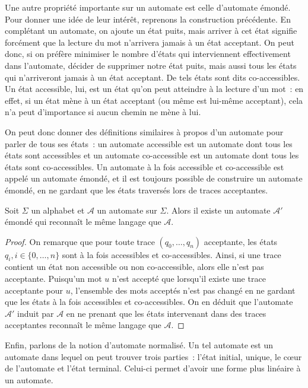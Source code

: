 Une autre propriété importante sur un automate est celle d'automate émondé.
Pour donner une idée de leur intérêt, reprenons la construction précédente.
En complétant un automate, on ajoute un état puits, mais arriver à cet état
signifie forcément que la lecture du mot n'arrivera jamais à un état acceptant.
On peut donc, si on préfère minimiser le nombre d'états qui interviennent
effectivement dans l'automate, décider de supprimer notre état puits, mais aussi
tous les états qui n'arriveront jamais à un état acceptant. De tels états sont
dits co-accessibles. Un état accessible, lui, est un état qu'on peut atteindre
à la lecture d'un mot~: en effet, si un état mène à un état acceptant (ou même
est lui-même acceptant), cela n'a peut d'importance si aucun chemin ne mène à
lui.

On peut donc donner des définitions similaires à propos d'un automate pour
parler de tous ses états~: un automate accessible est un automate dont tous les
états sont accessibles et un automate co-accessible est un automate dont tous
les états sont co-accessibles. Un automate à la fois accessible et co-accessible
est appelé un automate émondé, et il est toujours possible de construire un
automate émondé, en ne gardant que les états traversés lors de traces
acceptantes.

\begin{proposition}
  Soit $\Sigma$ un alphabet et $\mathcal A$ un automate sur $\Sigma$. Alors
  il existe un automate $\mathcal A'$ émondé qui reconnaît le même langage que
  $\mathcal A$.
\end{proposition}

\begin{proof}
  On remarque que pour toute trace $(q_0,\ldots,q_n)$ acceptante, les états
  $q_i, i \in \{0,\ldots,n\}$ sont à la fois accessibles et co-accessibles.
  Ainsi, si une trace contient un état non accessible ou non co-accessible,
  alors elle n'est pas acceptante. Puisqu'un mot $u$ n'est accepté que lorsqu'il
  existe une trace acceptante pour $u$, l'ensemble des mots acceptés n'est pas
  changé en ne gardant que les états à la fois accessibles et co-accessibles. On
  en déduit que l'automate $\mathcal A'$ induit par $\mathcal A$ en ne prenant
  que les états intervenant dans des traces acceptantes reconnaît le même
  langage que $\mathcal A$.
\end{proof}

Enfin, parlons de la notion d'automate normalisé. Un tel automate est un
automate dans lequel on peut trouver trois parties~: l'état initial,
unique, le c\oe ur de l'automate et l'état terminal. Celui-ci permet d'avoir
une forme plus linéaire à un automate.

